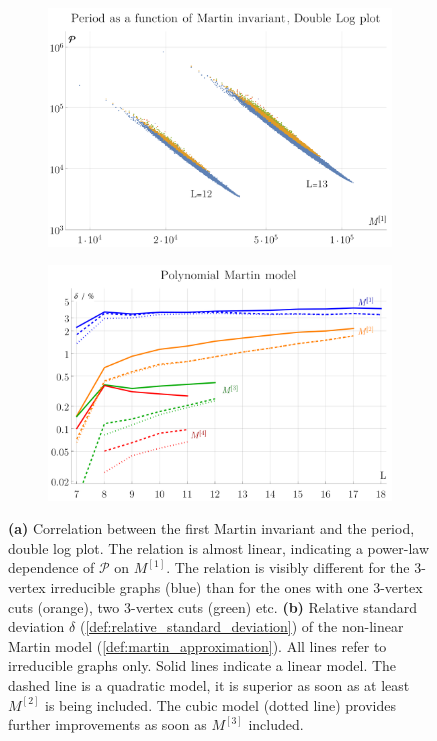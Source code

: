 \documentclass[12pt]{article}
\numberwithin{equation}{section}
\newcommand{\period}{\mathcal P}
\begin{document}
\begin{figure}[htb]
		\begin{subfigure}{ .49 \linewidth}
		\centering
		\includegraphics[width=\linewidth]{figures/martin_period}
		\subcaption{}
		\label{fig:martin_period}
	\end{subfigure}
	\begin{subfigure}{ .49 \linewidth}
		\centering
		\includegraphics[width=\linewidth]{figures/martin_quadratic_relative_standard_deviation}
		\subcaption{}
		\label{fig:martin_quadratic_relative_standard_deviation}
	\end{subfigure}

	\caption{ 	\textbf{(a)} Correlation between the first Martin invariant and the period, double log plot. The relation is almost linear, indicating a power-law dependence of $\period$ on $M^{[1]}$. The relation is visibly different for the 3-vertex irreducible graphs (blue) than for the ones with one 3-vertex cuts (orange), two 3-vertex cuts (green) etc. 
		\textbf{(b)} Relative standard deviation $\delta$ (\cref{def:relative_standard_deviation}) of the non-linear Martin model (\cref{def:martin_approximation}). All lines refer to irreducible graphs only. Solid lines indicate a linear model. The dashed line is a quadratic model, it is superior as soon as at least $M^{[2]}$ is being included. The cubic model (dotted line) provides further improvements as soon as $M^{[3]}$ included.  
	}
	
\end{figure}
\end{document}
